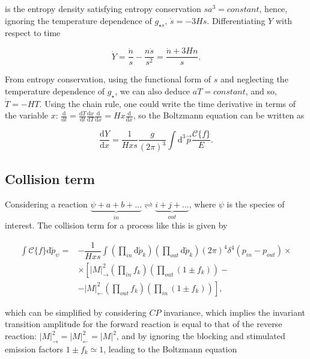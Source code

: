 \documentclass[final,5p,times,twocolumn, nopreprintline]{elsarticle}
\numberwithin{equation}{section}
\begin{document}
is the entropy density \cite{baumann2022cosmology} satisfying entropy conservation $sa^3=constant$, hence, ignoring the temperature dependence of $g_{\star s}$, $\dot{s}=-3Hs$. Differentiating $Y$ with respect to time

\begin{equation}
\dot{Y}=\dfrac{\dot{n}}{s}-\dfrac{n\dot{s}}{s^2}=\dfrac{\dot{n}+3Hn}{s}. \label{eq:Ydot}
\end{equation}

From entropy conservation, using the functional form of $s$ and neglecting the temperature dependence of $g_\star$, we can also deduce $aT=constant$, and so, $\dot{T}=-HT$. Using the chain rule, one could write the time derivative in terms of the variable $x$: $\frac{\mathrm{d}}{\mathrm{d}t}=\frac{\mathrm{d}T}{\mathrm{d}t}\frac{\mathrm{d}x}{\mathrm{d}T}\frac{\mathrm{d}}{\mathrm{d}x}=Hx\frac{\mathrm{d}}{\mathrm{d}x}$, so the Boltzmann equation can be written as \cite{mambrini2021particles}

\begin{equation}
\dfrac{\mathrm{d}Y}{\mathrm{d}x}=\dfrac{1}{Hxs}\dfrac{g}{(2\pi)^3}\int\mathrm{d}^3\vec{p}\dfrac{\mathcal{C}\{f\}}{E}. \label{eq:Boltz_Y}
\end{equation}

\subsection{Collision term}

Considering a reaction $\underbrace{\psi+a+b+...}_{in}\rightleftharpoons \underbrace{i+j+...}_{out}$, where $\psi$ is the species of interest. The collision term for a process like this is given by

\begin{align}
\int\mathcal{C}\{f\}\mathrm{d}\tilde{p}_\psi=&-\dfrac{1}{Hxs}\int\left(\prod_{in}\mathrm{d}\tilde{p}_k\right)\left(\prod_{out}\mathrm{d}\tilde{p}_k\right)(2\pi)^4\delta^4(p_{in}-p_{out})\times\nonumber\\
&\times\left[|M|^2_\rightarrow\left(\prod_{in}f_k\right)\left(\prod_{out}(1\pm f_k)\right)\right.-\nonumber\\
&-\left.|M|^2_\leftarrow\left(\prod_{out}f_k\right)\left(\prod_{in}(1\pm f_k)\right)\right], \label{eq:collision_gen}
\end{align}

which can be simplified by considering $CP$ invariance, which implies the invariant transition amplitude for the forward reaction is equal to that of the reverse reaction: $|M|^2_\rightarrow=|M|^2_\leftarrow=|M|^2$, and by ignoring the blocking and stimulated emission factors $1\pm f_k\simeq 1$, leading to the Boltzmann equation \cite{kolb1991early}
\end{document}
